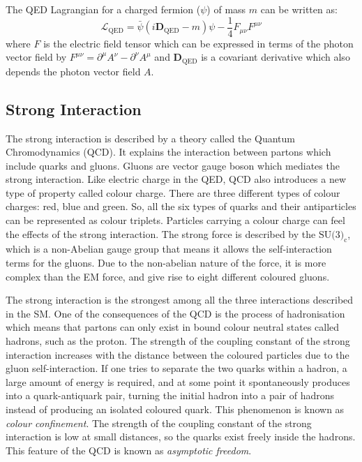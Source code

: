 The QED Lagrangian for a charged fermion ($\psi$) of mass $m$ can be written as:
\begin{equation}
	\mathcal{L}_{\text{QED}} = \bar{\psi}(i\textbf{D}_{\text{QED}} - m)\psi - \frac{1}{4}F_{\mu\nu}F^{\mu\nu}
\end{equation}
where $F$ is the electric field tensor which can be expressed in terms of the photon vector field by $F^{\mu\nu} = \partial^{\mu}A^{\nu} - \partial^{\nu}A^{\mu}$ and $\textbf{D}_{\text{QED}}$ is a covariant derivative which also depends the photon vector field $A$.~\cite{halzen}

\subsection{Strong Interaction}%
\label{sec:theory:standardmodel:strong}
The strong interaction is described by a theory called the Quantum Chromodynamics (QCD). It explains the interaction between partons which include quarks and gluons. Gluons are vector gauge boson which mediates the strong interaction. Like electric charge in the QED, QCD also introduces a new type of property called colour charge. There are three different types of colour charges: red, blue and green. So, all the six types of quarks and their antiparticles can be represented as colour triplets. Particles carrying a colour charge can feel the effects of the strong interaction. The strong force is described by the $\text{SU(3)}_{\text{c}}$, which is a non-Abelian gauge group that means it allows the self-interaction terms for the gluons. Due to the non-abelian nature of the force, it is more complex than the EM force, and give rise to eight different coloured gluons.~\cite{halzen}

The strong interaction is the strongest among all the three interactions described in the SM. One of the consequences of the QCD is the process of hadronisation which means that partons can only exist in bound colour neutral states called hadrons, such as the proton. The strength of the coupling constant of the strong interaction increases with the distance between the coloured particles due to the gluon self-interaction. If one tries to separate the two quarks within a hadron, a large amount of energy is required, and at some point it spontaneously produces into a quark-antiquark pair, turning the initial hadron into a pair of hadrons instead of producing an isolated coloured quark. This phenomenon is known as \textit{colour confinement}. The strength of the coupling constant of the strong interaction is low at small distances, so the quarks exist freely inside the hadrons. This feature of the QCD is known as \textit{asymptotic freedom}.~\cite{thomson}

